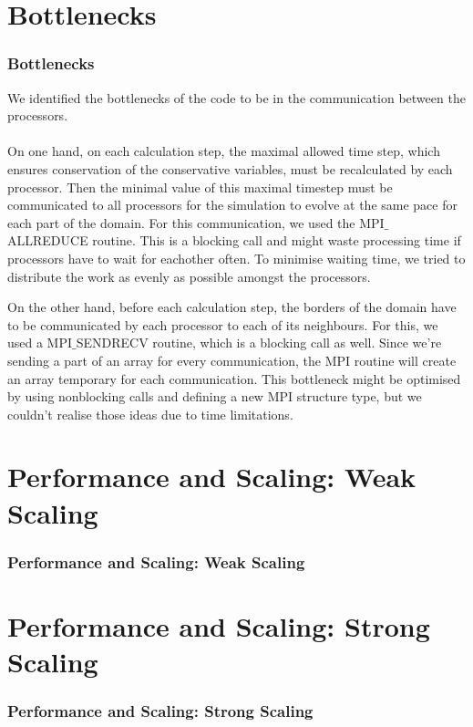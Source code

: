 \documentclass[8pt]{beamer}
\begin{document}
\section{Bottlenecks}
\begin{frame}
	\frametitle{Bottlenecks}
	We identified the bottlenecks of the code to be in the communication between the processors.\\~\\
	
	On one hand, on each calculation step, the maximal allowed time step, which ensures conservation of the conservative variables, must be recalculated by each processor. Then the minimal value of this maximal timestep must be communicated to all processors for the simulation to evolve at the same pace for each part of the domain. For this communication, we used the MPI$\_$ALLREDUCE routine. This is a blocking call and might waste processing time if processors have to wait for eachother often. To minimise waiting time, we tried to distribute the work as evenly as possible amongst the processors.
	
	On the other hand, before each calculation step, the borders of the domain have to be communicated by each processor to each of its neighbours. For this, we used a MPI$\_$SENDRECV routine, which is a blocking call as well. Since we're sending a part of an array for every communication, the MPI routine will create an array temporary for each communication. This bottleneck might be optimised by using nonblocking calls and defining a new MPI structure type, but we couldn't realise those ideas due to time limitations.
\end{frame}




\section{Performance and Scaling: Weak Scaling}

\begin{frame}
	\frametitle{Performance and Scaling: Weak Scaling} 
\end{frame}


\section{Performance and Scaling: Strong Scaling}

\begin{frame}
	\frametitle{Performance and Scaling: Strong Scaling} 
\end{frame}
\end{document}
